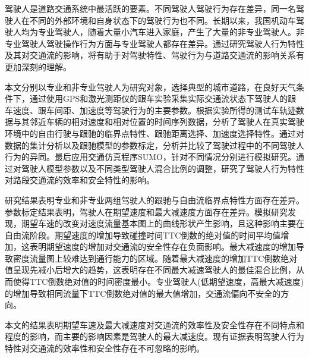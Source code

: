 驾驶人是道路交通系统中最活跃的要素。不同驾驶人驾驶行为存在差异，同一名驾驶人在不同的外部环境和自身状态下的驾驶行为也不同。长期以来，我国机动车驾驶人均为专业驾驶人，随着大量小汽车进入家庭，产生了大量的非专业驾驶人。非专业驾驶人驾驶操作行为方面与专业驾驶人都存在差异。通过研究驾驶人行为特性及其对交通流的影响，将有助于对驾驶特性、驾驶行为与道路交通流的影响关系有更加深刻的理解。

本文分别以专业和非专业驾驶人为研究对象，选择典型的城市道路，在良好天气条件下，通过使用GPS和激光测距仪的跟车实验采集实际交通流状态下驾驶人的跟车速度、跟车间距、加速度等驾驶行为的主要参数。根据实验所得的测试车轨迹数据与其邻近车辆的相对速度和相对位置的时间序列数据，分析了驾驶人在真实驾驶环境中的自由行驶与跟驰的临界点特性、跟驰距离选择、加速度选择特性。通过对数据的集计分析以及跟驰模型的参数标定，分析并比较了驾驶过程中的不同驾驶人行为的异同。最后应用交通仿真程序SUMO，针对不同情况分别进行模拟研究。通过对驾驶人模型参数以及不同类型驾驶人混合比例的调整，研究了驾驶人行为特性对路段交通流的效率和安全特性的影响。

研究结果表明专业和非专业两组驾驶人的跟驰与自由流临界点特性方面存在差异。参数标定结果表明，驾驶人在期望速度和最大减速度方面存在差异。模拟研究发现，期望车速的改变对速度流量基本图上的曲线形状产生影响，且这种影响主要在自由流阶段。期望速度的增加导致碰撞时间TTC倒数的绝对值的时间平均值增加，这表明期望速度的增加对交通流的安全性存在负面影响。最大减速度的增加导致密度流量图上较难达到通行能力的区域。随着最大减速度的增加TTC倒数绝对值呈现先减小后增大的趋势，这表明存在不同最大减速驾驶人的最佳混合比例，从而使得TTC倒数绝对值的时间密度最小。专业驾驶人(低期望速度，高最大减速度)的增加导致相同流量下TTC倒数绝对值的最大值增加，交通流偏向不安全的方向。

本文的结果表明期望车速及最大减速度对交通流的效率性及安全性存在不同特点和程度的影响，而主要的影响因素是驾驶人的最大减速度。现有证据表明驾驶人行为特性对交通流的效率性和安全性存在不可忽略的影响。